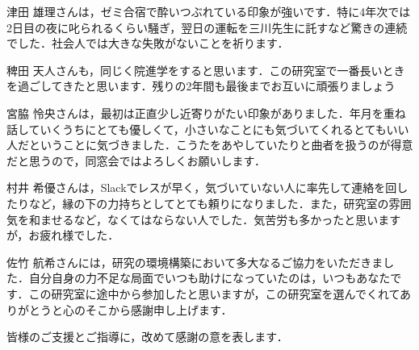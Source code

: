 津田 雄理さんは，ゼミ合宿で酔いつぶれている印象が強いです．特に4年次では2日目の夜に叱られるくらい騒ぎ，翌日の運転を三川先生に託すなど驚きの連続でした．社会人では大きな失敗がないことを祈ります．

稗田 天人さんも，同じく院進学をすると思います．この研究室で一番長いときを過ごしてきたと思います．残りの2年間も最後までお互いに頑張りましょう

宮脇 怜央さんは，最初は正直少し近寄りがたい印象がありました．年月を重ね話していくうちにとても優しくて，小さいなことにも気づいてくれるとてもいい人だということに気づきました．こうたをあやしていたりと曲者を扱うのが得意だと思うので，同窓会ではよろしくお願いします．

村井 希優さんは，Slackでレスが早く，気づいていない人に率先して連絡を回したりなど，縁の下の力持ちとしてとても頼りになりました．また，研究室の雰囲気を和ませるなど，なくてはならない人でした．気苦労も多かったと思いますが，お疲れ様でした．

佐竹 航希さんには，研究の環境構築において多大なるご協力をいただきました．自分自身の力不足な局面でいつも助けになっていたのは，いつもあなたです．この研究室に途中から参加したと思いますが，この研究室を選んでくれてありがとうと心のそこから感謝申し上げます．

皆様のご支援とご指導に，改めて感謝の意を表します．